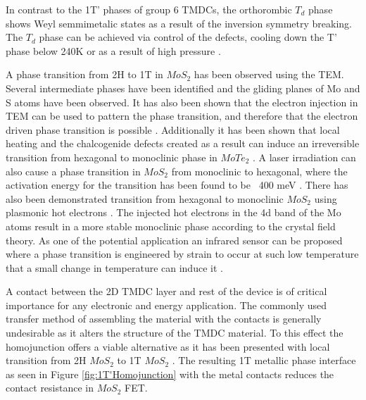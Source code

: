 In contrast to the 1T' phases of group 6 TMDCs, the orthorombic $T_d$ phase shows Weyl semmimetalic states as a result of the inversion symmetry breaking. The $T_d$ phase can be achieved via control of the defects, cooling down the T' phase below 240K or as a result of high pressure \cite{Qi2016}. 

A phase transition from 2H to 1T in $MoS_2$ has been observed using the TEM. Several intermediate phases have been identified and the gliding planes of Mo and S atoms have been observed. It has also been shown that the electron injection in TEM can be used to pattern the phase transition, and therefore that the electron driven phase transition is possible \cite{Lin2014}. Additionally it has been shown that local heating and the chalcogenide defects created as a result can induce an irreversible transition from hexagonal to monoclinic phase in $MoTe_2$ \cite{Cho2015}. A laser irradiation can also cause a phase transition in $MoS_2$ from monoclinic to hexagonal, where the activation energy for the transition has been found to be ~400 meV \cite{Guo2015}. There has also been demonstrated transition from hexagonal to monoclinic $MoS_2$ using plasmonic hot electrons \cite{Kang2014}. The injected hot electrons in the 4d band of the Mo atoms result in a more stable monoclinic phase according to the crystal field theory. As one of the potential application an infrared sensor can be proposed where a phase transition is engineered by strain to occur at such low temperature that a small change in temperature can induce it \cite{Song2015}.

A contact between the 2D TMDC layer and rest of the device is of critical importance for any electronic and energy application. The commonly used transfer method of assembling the material with the contacts is generally undesirable as it alters the structure of the TMDC material. To this effect the homojunction offers a viable alternative as it has been presented with local transition from 2H $MoS_2$ to 1T $MoS_2$ \cite{Kappera2014}. The resulting 1T metallic phase interface as seen in Figure \ref{fig:1T'Homojunction} with the metal contacts reduces the contact resistance in $MoS_2$ FET.

